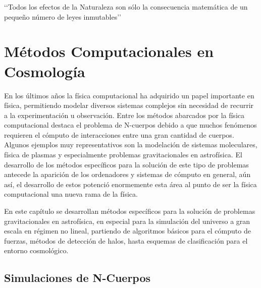 \begin{savequote}[50mm]
‘‘Todos los efectos de la Naturaleza son sólo la consecuencia matemática 
de un pequeño número de leyes inmutables’’
\end{savequote}




\chapter{Métodos Computacionales en Cosmología}
\label{cha:N-BodySimulations}


En los últimos años la física computacional ha adquirido un papel 
importante en física, permitiendo modelar diversos sistemas complejos sin
necesidad de recurrir a la experimentación u observación. Entre los 
métodos abarcados por la física computacional destaca el problema de 
N-cuerpos debido a que muchos fenómenos requieren el cómputo de 
interacciones entre una gran cantidad de cuerpos. Algunos ejemplos muy 
representativos son la modelación de sistemas moleculares, física de 
plasmas y especialmente problemas gravitacionales en astrofísica. El 
desarrollo de los métodos específicos para la solución de este tipo de 
problemas antecede la aparición de los ordenadores y sistemas de cómputo 
en general, aún así, el desarrollo de estos potenció enormemente esta área
al punto de ser la física computacional una nueva rama de la física.


En este capítulo se desarrollan métodos específicos para la solución de 
proble\-mas gravitacionales en astrofísica, en especial para la simulación
del universo a gran escala en régimen no lineal, partiendo de algoritmos 
básicos para el cómputo de fuerzas, métodos de detección de halos, hasta 
esquemas de clasificación para el entorno cosmológico.
 





\section{Simulaciones de N-Cuerpos}
\label{sec:N-bodySimulations}


